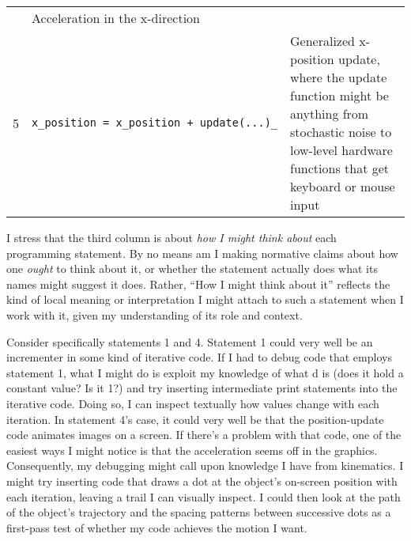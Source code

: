 \begin{longtable}[]{@{}lll@{}}
\begin{minipage}[t]{0.08\columnwidth}
\strut\end{minipage} &
\begin{minipage}[t]{0.08\columnwidth}\raggedright\strut
Acceleration in the x-direction
\strut\end{minipage}\tabularnewline
\begin{minipage}[t]{0.08\columnwidth}\raggedright\strut
5
\strut\end{minipage} &
\begin{minipage}[t]{0.08\columnwidth}\raggedright\strut
\texttt{x\_position\ =\ x\_position\ +\ update(...)\_}
\strut\end{minipage} &
\begin{minipage}[t]{0.08\columnwidth}\raggedright\strut
Generalized x-position update, where the update function might be
anything from stochastic noise to low-level hardware functions that get
keyboard or mouse input
\strut\end{minipage}\tabularnewline
\bottomrule
\end{longtable}

I stress that the third column is about \emph{how I might think about}
each programming statement\emph{.} By no means am I making normative
claims about how one \emph{ought} to think about it, or whether the
statement actually does what its names might suggest it does. Rather,
``How I might think about it'' reflects the kind of local meaning or
interpretation I might attach to such a statement when I work with it,
given my understanding of its role and context.

Consider specifically statements 1 and 4. Statement 1 could very well be
an incrementer in some kind of iterative code. If I had to debug code
that employs statement 1, what I might do is exploit my knowledge of
what d is (does it hold a constant value? Is it 1?) and try inserting
intermediate print statements into the iterative code. Doing so, I can
inspect textually how values change with each iteration. In statement
4's case, it could very well be that the position-update code animates
images on a screen. If there's a problem with that code, one of the
easiest ways I might notice is that the acceleration seems off in the
graphics. Consequently, my debugging might call upon knowledge I have
from kinematics. I might try inserting code that draws a dot at the
object's on-screen position with each iteration, leaving a trail I can
visually inspect. I could then look at the path of the object's
trajectory and the spacing patterns between successive dots as a
first-pass test of whether my code achieves the motion I want.

